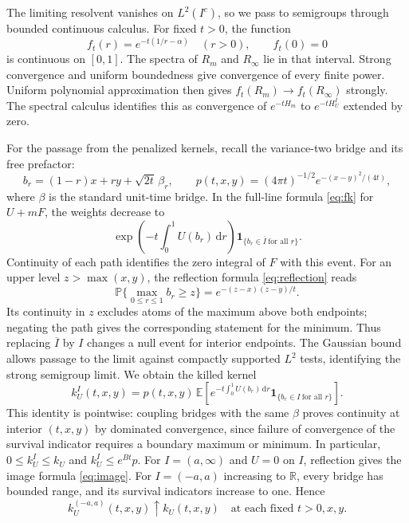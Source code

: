 \documentclass[11pt,a4paper]{article}
\newcommand{\R}{\mathbb R}
\newcommand{\dd}{\,\mathrm d}
\begin{document}
The limiting resolvent vanishes on $L^2(I^c)$, so we pass to semigroups
through bounded continuous calculus. For fixed $t>0$, the
function
\[
 f_t(r)=e^{-t(1/r-\alpha)}\quad(r>0),\qquad f_t(0)=0
\]
is continuous on $[0,1]$. The spectra of $R_m$ and $R_\infty$ lie in that
interval. Strong convergence and uniform boundedness give convergence of
every finite power. Uniform polynomial approximation then gives
$f_t(R_m)\to f_t(R_\infty)$ strongly. The spectral calculus identifies this
as convergence of $e^{-tH_m}$ to $e^{-tH_U^I}$ extended by zero.

For the passage from the penalized kernels, recall the variance-two bridge
and its free prefactor:
\[
 b_r=(1-r)x+ry+\sqrt{2t}\,\beta_r,\qquad
 p(t,x,y)=(4\pi t)^{-1/2}e^{-(x-y)^2/(4t)},
\]
where $\beta$ is the standard unit-time bridge. In the full-line formula
\eqref{eq:fk} for $U+mF$, the weights decrease to
\[
 \exp\left(-t\int_0^1 U(b_r)\dd r\right)
       \mathbf1_{\{b_r\in\overline I\ \text{for all }r\}}.
\]
Continuity of each path identifies the zero integral of $F$ with this
event. For an upper level $z>\max(x,y)$, the reflection formula
\eqref{eq:reflection} reads
\[
 \mathbb P\{\max_{0\leq r\leq1}b_r\geq z\}
       =e^{-(z-x)(z-y)/t}.
\]
Its continuity in $z$ excludes atoms of the maximum above both endpoints;
negating the path gives the corresponding statement for the minimum.
Thus replacing $\overline I$ by $I$ changes a null
event for interior endpoints. The Gaussian bound allows passage to the
limit against compactly supported $L^2$ tests, identifying the strong
semigroup limit. We obtain the killed kernel
\begin{equation}\label{eq:killed}
 k_U^I(t,x,y)=p(t,x,y)\,
  \mathbb E\left[
   e^{-t\int_0^1U(b_r)\dd r}
   \mathbf1_{\{b_r\in I\ \text{for all }r\}}\right].
\end{equation}
This identity is pointwise: coupling bridges with the same $\beta$ proves
continuity at interior $(t,x,y)$ by dominated convergence, since failure of
convergence of the survival indicator requires a boundary maximum or
minimum. In particular, $0\leq k_U^I\leq k_U$ and $k_U^I\leq e^{Bt}p$.
For $I=(a,\infty)$ and $U=0$ on $I$, reflection gives the image formula
\eqref{eq:image}. For $I=(-a,a)$ increasing to $\R$, every bridge has
bounded range, and its survival indicators increase to one. Hence
\begin{equation}\label{eq:heat-exhaustion}
 k_U^{(-a,a)}(t,x,y)\uparrow k_U(t,x,y)
 \quad\text{at each fixed }t>0,x,y.
\end{equation}
\end{document}
